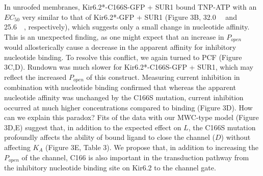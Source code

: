 \documentclass[10pt,lineno, doublespacing]{elife_modified}
\begin{document}
In unroofed membranes, Kir6.2*-C166S-GFP + SUR1 bound TNP-ATP with an $EC_{50}$ very similar to that of Kir6.2*-GFP + SUR1 (Figure 3B, \SI{32.0}{\micro\Molar} and \SI{25.6}{\micro\Molar}, respectively), which suggests only a small change in nucleotide affinity.
This is an unexpected finding, as one might expect that an increase in $P_{open}$ would allosterically cause a decrease in the apparent affinity for inhibitory nucleotide binding.
To resolve this conflict, we again turned to PCF (Figure 3C,D). Rundown was much slower for Kir6.2*-C166S-GFP + SUR1, which may reflect the increased $P_{open}$ of this construct.
Measuring current inhibition in combination with nucleotide binding confirmed that whereas the apparent nucleotide affinity was unchanged by the C166S mutation, current inhibition occurred at much higher concentrations compared to binding (Figure 3D).
How can we explain this paradox?
Fits of the data with our MWC-type model (Figure 3D,E) suggest that, in addition to the expected effect on $L$, the C166S mutation profoundly affects the ability of bound ligand to close the channel ($D$) without affecting $K_A$ (Figure 3E, Table 3).
We propose that, in addition to increasing the $P_{open}$ of the channel, C166 is also important in the transduction pathway from the inhibitory nucleotide binding site on Kir6.2 to the channel gate.
\end{document}
